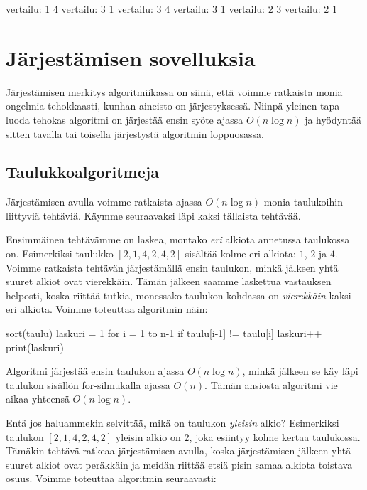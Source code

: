 \begin{code}
vertailu: 1 4
vertailu: 3 1
vertailu: 3 4
vertailu: 3 1
vertailu: 2 3
vertailu: 2 1
\end{code}

\section{Järjestämisen sovelluksia}

Järjestämisen merkitys algoritmiikassa on siinä,
että voimme ratkaista monia ongelmia tehokkaasti, 
kunhan aineisto on järjestyksessä.
Niinpä yleinen tapa luoda tehokas algoritmi on järjestää
ensin syöte ajassa $O(n \log n)$ ja hyödyntää sitten
tavalla tai toisella järjestystä algoritmin loppuosassa.

\subsection{Taulukkoalgoritmeja}

\label{sec:taukas}

Järjestämisen avulla voimme ratkaista ajassa
$O(n \log n)$ monia taulukoihin liittyviä tehtäviä.
Käymme seuraavaksi läpi kaksi tällaista tehtävää.

Ensimmäinen tehtävämme on laskea,
montako \emph{eri} alkiota annetussa taulukossa on.
Esimerkiksi taulukko $[2,1,4,2,4,2]$ sisältää kolme
eri alkiota: $1$, $2$ ja $4$.
Voimme ratkaista tehtävän järjestämällä ensin taulukon,
minkä jälkeen yhtä suuret alkiot ovat vierekkäin.
Tämän jälkeen saamme laskettua vastauksen helposti,
koska riittää tutkia, monessako taulukon kohdassa on
\emph{vierekkäin} kaksi eri alkiota.
Voimme toteuttaa algoritmin näin:

\begin{code}
sort(taulu)
laskuri = 1
for i = 1 to n-1
    if taulu[i-1] != taulu[i]
        laskuri++
print(laskuri)
\end{code}

Algoritmi järjestää ensin taulukon ajassa $O(n \log n)$,
minkä jälkeen se käy läpi taulukon sisällön for-silmukalla
ajassa $O(n)$.
Tämän ansiosta algoritmi vie aikaa yhteensä $O(n \log n)$.


Entä jos haluammekin selvittää, mikä on taulukon \emph{yleisin} alkio?
Esimerkiksi taulukon $[2,1,4,2,4,2]$ yleisin alkio on $2$,
joka esiintyy kolme kertaa taulukossa.
Tämäkin tehtävä ratkeaa järjestämisen avulla, koska
järjestämisen jälkeen yhtä suuret alkiot ovat peräkkäin ja
meidän riittää etsiä pisin samaa alkiota toistava osuus.
Voimme toteuttaa algoritmin seuraavasti:

